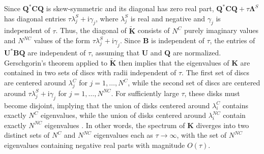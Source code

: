 \documentclass[preprint,10pt]{elsarticle}
\newcommand{\mi}{\mathrm{i}} %
\newcommand{\note}[1]{#1}
\begin{document}
Since $\bm{Q}^*\bm{C}\bm{Q}$ is skew-symmetric and its diagonal has zero real part, $\bm{Q}^*\bm{C}\bm{Q} + \tau \bm{\Lambda}^{S}$ has diagonal entries $\tau \lambda^S_j + \mi\gamma_j$, where $\lambda^S_j$ is real and negative and $\gamma_j$ is independent of $\tau$.  Thus, the diagonal of $\tilde{\bm{K}}$ consists of $N^C$ purely imaginary values and $N^{NC}$ values of the form $\tau \lambda^S_j + \mi\gamma_j$.  Since $\bm{B}$ is independent of $\tau$, the entries of $\bm{U}^*\bm{B}\bm{Q}$ are independent of $\tau$, assuming that $\bm{U}$ and $\bm{Q}$ are normalized.  Gerschgorin's theorem applied to $\tilde{\bm{K}}$ then implies that the eigenvalues of $\bm{K}$ are contained in two sets of discs with radii independent of $\tau$.  The first set of discs are centered around $\lambda^C_j$ for $j = 1,\ldots,N^C$, while the second set of discs are centered around $\tau\lambda^S_j + \mi\gamma_j$ for $j = 1,\ldots,N^{NC}$. For sufficiently large $\tau$, these disks must become disjoint, implying that the union of disks centered around  $\lambda^C_i$ contains exactly $N^C$ eigenvalues, while the union of disks centered around  $\lambda^{NC}_i$ contain exactly $N^{NC}$ eigenvalues \cite{horn2012matrix}.  In other words, the \note{spectrum} of $\bm{K}$ diverges into two distinct sets of $N^C$ and $N^{NC}$ eigenvalues each as $\tau \rightarrow \infty$, with the set of $N^{NC}$ eigenvalues containing negative real parts with magnitude $O(\tau)$.  
\end{document}
